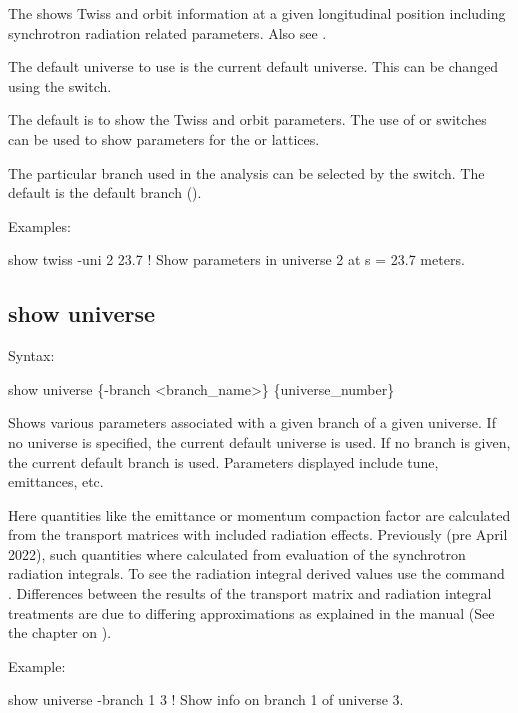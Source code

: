 {{{{{{{{{{{The  shows Twiss and orbit information at a given longitudinal position
 including synchrotron radiation related parameters. Also see .

The default universe to use is the current default universe. This can be changed using the
 switch.

The default is to show the  Twiss and orbit parameters. The use of  or
 switches can be used to show parameters for the  or  lattices.

The particular branch used in the analysis can be selected by the  switch. The
default is the default branch ().

Examples:
\begin{example}
  show twiss -uni 2 23.7     ! Show parameters in universe 2 at s = 23.7 meters.
\end{example} 


\subsection{show universe}
\label{s:show.universe}

Syntax:
\begin{example}
  show universe \{-branch <branch_name>\} \{universe_number\}
\end{example}

Shows various parameters associated with a given branch of a given universe. If no universe is
specified, the current default universe is used. If no branch is given, the current default branch
is used. Parameters displayed include tune, emittances, etc. 

Here quantities like the emittance or momentum compaction factor are calculated from the transport
matrices with included radiation effects. Previously (pre April 2022), such quantities where
calculated from evaluation of the synchrotron radiation integrals. To see the radiation integral
derived values use the command  . Differences between the results
of the transport matrix and radiation integral treatments are due to differing approximations as
explained in the \bmad manual (See the chapter on ).

Example:
\begin{example}
  show universe -branch 1 3  ! Show info on branch 1 of universe 3.
\end{example}

}}}}}}}}}}}
